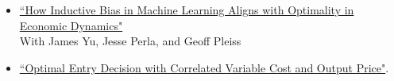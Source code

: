 \documentclass[10pt]{article}
\newcommand{\makeheading}[2][]%
        {\hspace*{-\marginparsep minus \marginparwidth}%
         \begin{minipage}[t]{\textwidth+\marginparwidth+\marginparsep}%
             {\large \bfseries #2 \hfill #1}\\[-0.15\baselineskip]%
                 \rule{\columnwidth}{1pt}%
         \end{minipage}}
\renewcommand{\section}[1]{\pagebreak[3]%
    \hyphenpenalty=10000%
    \vspace{1.3\baselineskip}%
    \phantomsection\addcontentsline{toc}{section}{#1}%
    \noindent\llap{\scshape\smash{\parbox[t]{\marginparwidth}{\raggedright #1}}}%
    \vspace{-\baselineskip}\par}
\newenvironment{innerlist}[1][\enskip\textbullet]%
        {\begin{itemize}[#1,leftmargin=*,parsep=0pt,itemsep=0pt,topsep=0pt,partopsep=0pt]}
        {\end{itemize}}
\begin{document}
\begin{innerlist}
\item 	\href{https://arxiv.org/abs/2406.01898}{``How Inductive Bias in Machine Learning Aligns with Optimality in Economic Dynamics"}\\
{\small With James Yu, Jesse Perla, and Geoff Pleiss}

\item \href{https://mekahou.github.io/docs/Papers/input_output.pdf}{``Optimal Entry Decision with Correlated Variable Cost and Output Price"}. \\
\end{innerlist}

\end{document}
